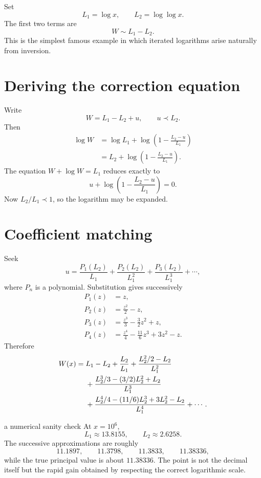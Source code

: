 \documentclass[11pt,openany]{book}
\theoremstyle{plain}
\theoremstyle{definition}
\theoremstyle{remark}
\begin{document}
Set
\[
  L_1=\log x,
  \qquad
  L_2=\log\log x.
\]
The first two terms are
\[
  W\sim L_1-L_2.
\]
This is the simplest famous example in which iterated logarithms arise naturally from inversion.

\section{Deriving the correction equation}
Write
\[
  W=L_1-L_2+u,
  \qquad u\prec L_2.
\]
Then
\begin{align*}
  \log W
  &=\log L_1+
    \log\left(1-\frac{L_2-u}{L_1}\right)\\
  &=L_2+
    \log\left(1-\frac{L_2-u}{L_1}\right).
\end{align*}
The equation $W+\log W=L_1$ reduces exactly to
\[
  u+\log\left(1-\frac{L_2-u}{L_1}\right)=0.
\]
Now $L_2/L_1\prec1$, so the logarithm may be expanded.

\section{Coefficient matching}
Seek
\[
  u=\frac{P_1(L_2)}{L_1}
    +\frac{P_2(L_2)}{L_1^2}
    +\frac{P_3(L_2)}{L_1^3}+\cdots,
\]
where $P_n$ is a polynomial. Substitution gives successively
\begin{align*}
 P_1(z)&=z,\\
 P_2(z)&=\frac{z^2}{2}-z,\\
 P_3(z)&=\frac{z^3}{3}-\frac32z^2+z,\\
 P_4(z)&=\frac{z^4}{4}-\frac{11}{6}z^3+3z^2-z.
\end{align*}
Therefore
\begin{align}
 W(x)={}&L_1-L_2+\frac{L_2}{L_1}
 +\frac{L_2^2/2-L_2}{L_1^2}\notag\\
 &+\frac{L_2^3/3-(3/2)L_2^2+L_2}{L_1^3}\notag\\
 &+\frac{L_2^4/4-(11/6)L_2^3+3L_2^2-L_2}{L_1^4}
 +\cdots.
 \label{eq:Wexpansion}
\end{align}

\begin{workedbox}{a numerical sanity check}
At $x=10^6$,
\[
  L_1\approx13.8155,
  \qquad L_2\approx2.6258.
\]
The successive approximations are roughly
\[
  11.1897,
  \qquad 11.3798,
  \qquad 11.3833,
  \qquad 11.38336,
\]
while the true principal value is about $11.38336$. The point is not the decimal itself but the rapid gain obtained by respecting the correct logarithmic scale.
\end{workedbox}
\end{document}
